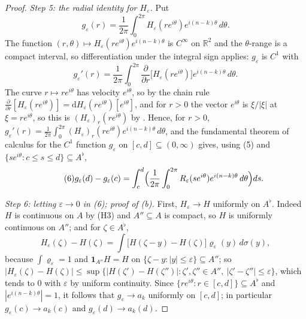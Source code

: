 \begin{proof}
\emph{Step 5: the radial identity for $H_\varepsilon$.}  Put
\[
  g_\varepsilon(r)=\frac1{2\pi}\int_0^{2\pi}
    H_\varepsilon(re^{i\theta})e^{i(n-k)\theta}\,d\theta .
\]
The function $(r,\theta)\mapsto H_\varepsilon(re^{i\theta})e^{i(n-k)\theta}$ is
$C^\infty$ on $\mathbb{R}^2$ and the $\theta$-range is a compact interval, so
differentiation under the integral sign applies: $g_\varepsilon$ is $C^1$ with
\[
  g_\varepsilon'(r)=\frac1{2\pi}\int_0^{2\pi}
    \frac{\partial}{\partial r}\bigl[H_\varepsilon(re^{i\theta})\bigr]
    e^{i(n-k)\theta}\,d\theta .
\]
The curve $r\mapsto re^{i\theta}$ has velocity $e^{i\theta}$, so by the chain
rule $\frac{\partial}{\partial r}[H_\varepsilon(re^{i\theta})]
=\mathrm{d}H_\varepsilon(re^{i\theta})[e^{i\theta}]$, and for $r>0$ the vector
$e^{i\theta}$ is $\xi/|\xi|$ at $\xi=re^{i\theta}$, so this is
$(H_\varepsilon)_r(re^{i\theta})$ by .  Hence, for $r>0$,
$g_\varepsilon'(r)=\frac1{2\pi}\int_0^{2\pi}(H_\varepsilon)_r(re^{i\theta})
e^{i(n-k)\theta}\,d\theta$, and the fundamental theorem of calculus for the
$C^1$ function $g_\varepsilon$ on $[c,d]\subseteq(0,\infty)$ gives, using (5)
and $\{se^{i\theta}:c\le s\le d\}\subseteq A^\flat$,
\begin{equation}\tag{6}
  g_\varepsilon(d)-g_\varepsilon(c)
  =\int_c^d\Bigl(\frac1{2\pi}\int_0^{2\pi}
     R_\varepsilon(se^{i\theta})e^{i(n-k)\theta}\,d\theta\Bigr)ds .
\end{equation}

\emph{Step 6: letting $\varepsilon\to0$ in (6); proof of (b).}  First,
$H_\varepsilon\to H$ uniformly on $A^\flat$.  Indeed $H$ is continuous on $A$
by (H3) and $A''\subseteq A$ is compact, so $H$ is uniformly continuous on
$A''$; and for $\zeta\in A^\flat$,
\[
  H_\varepsilon(\zeta)-H(\zeta)
  =\int\bigl[H(\zeta-y)-H(\zeta)\bigr]\varrho_\varepsilon(y)\,d\sigma(y),
\]
because $\int\varrho_\varepsilon=1$ and $\mathbf1_{A''}H=H$ on
$\{\zeta-y:|y|\le\varepsilon\}\subseteq A''$; so
$|H_\varepsilon(\zeta)-H(\zeta)|\le\sup\{|H(\zeta')-H(\zeta'')|:
\zeta',\zeta''\in A'',\ |\zeta'-\zeta''|\le\varepsilon\}$, which tends to $0$
with $\varepsilon$ by uniform continuity.  Since
$\{re^{i\theta}:r\in[c,d]\}\subseteq A^\flat$ and $|e^{i(n-k)\theta}|=1$, it
follows that $g_\varepsilon\to a_k$ uniformly on $[c,d]$; in particular
$g_\varepsilon(c)\to a_k(c)$ and $g_\varepsilon(d)\to a_k(d)$.


\end{proof}
